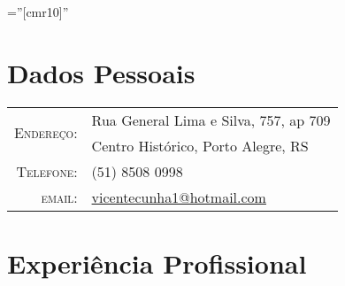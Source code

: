 \documentclass[a4paper,10pt]{article} %
\begin{document}
\pagestyle{empty} %

\font\fb=''[cmr10]'' %


\par{\bigskip\par} %

\section{Dados Pessoais}

\begin{tabular}{rl}
\multirow{2}{*}{\textsc{Endereço:}} & Rua General Lima e Silva, 757, ap 709 \\ &Centro Histórico, Porto Alegre, RS \\
\textsc{Telefone:} & (51) 8508 0998\\
\textsc{email:} & \href{mailto:vicentecunha1@hotmail.com}{vicentecunha1@hotmail.com}
\end{tabular}


\section{Experiência Profissional}
\end{document}
